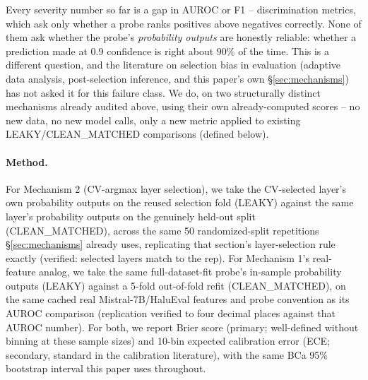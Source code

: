 \documentclass{article}
\begin{document}
Every severity number so far is a gap in AUROC or F1 -- discrimination
metrics, which ask only whether a probe ranks positives above negatives
correctly. None of them ask whether the probe's \emph{probability outputs}
are honestly reliable: whether a prediction made at $0.9$ confidence is
right about $90\%$ of the time. This is a different question, and the
literature on selection bias in evaluation (adaptive data analysis,
post-selection inference, and this paper's own \S\ref{sec:mechanisms}) has
not asked it for this failure class. We do, on two structurally distinct
mechanisms already audited above, using their own already-computed scores --
no new data, no new model calls, only a new metric applied to existing
LEAKY/CLEAN\_MATCHED comparisons (defined below).

\paragraph{Method.} For Mechanism 2 (CV-argmax layer selection), we take the
CV-selected layer's own probability outputs on the reused selection fold
(LEAKY) against the same layer's probability outputs on the genuinely
held-out split (CLEAN\_MATCHED), across the same 50 randomized-split
repetitions \S\ref{sec:mechanisms} already uses, replicating that section's
layer-selection rule exactly (verified: selected layers match to the rep).
For Mechanism 1's real-feature analog, we take the same full-dataset-fit
probe's in-sample probability outputs (LEAKY) against a 5-fold
out-of-fold refit (CLEAN\_MATCHED), on the same cached real Mistral-7B/HaluEval
features and probe convention as its AUROC comparison (replication verified
to four decimal places against that AUROC number). For both, we report Brier
score (primary; well-defined without binning at these sample sizes) and
10-bin expected calibration error (ECE; secondary, standard in the
calibration literature), with the same BCa 95\% bootstrap interval this
paper uses throughout.
\end{document}
